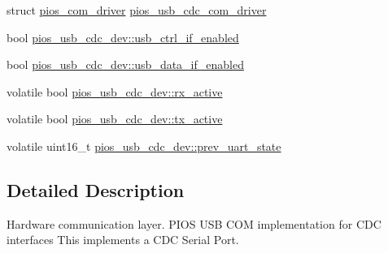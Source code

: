 \begin{DoxyCompactItemize}
\item 
struct \hyperlink{structpios__com__driver}{pios\-\_\-com\-\_\-driver} \hyperlink{group___p_i_o_s___u_s_b___c_o_m_gad661bf144c28ea36f290b0092e6957e2}{pios\-\_\-usb\-\_\-cdc\-\_\-com\-\_\-driver}
\item 
bool \hyperlink{group___p_i_o_s___u_s_b___c_o_m_ga27ad044c09bb6b13874d1d1281aa397f}{pios\-\_\-usb\-\_\-cdc\-\_\-dev\-::usb\-\_\-ctrl\-\_\-if\-\_\-enabled}
\item 
bool \hyperlink{group___p_i_o_s___u_s_b___c_o_m_gaa0a4b4afa2a6f6c20709f878b026ecc5}{pios\-\_\-usb\-\_\-cdc\-\_\-dev\-::usb\-\_\-data\-\_\-if\-\_\-enabled}
\item 
volatile bool \hyperlink{group___p_i_o_s___u_s_b___c_o_m_gad41e79606da14368c2716f4bc3c84618}{pios\-\_\-usb\-\_\-cdc\-\_\-dev\-::rx\-\_\-active}
\item 
volatile bool \hyperlink{group___p_i_o_s___u_s_b___c_o_m_ga5ebf71c716fc76c564cf8217adeb956c}{pios\-\_\-usb\-\_\-cdc\-\_\-dev\-::tx\-\_\-active}
\item 
volatile uint16\-\_\-t \hyperlink{group___p_i_o_s___u_s_b___c_o_m_ga945dfed2223e17061cb6e4257c2b2624}{pios\-\_\-usb\-\_\-cdc\-\_\-dev\-::prev\-\_\-uart\-\_\-state}
\end{DoxyCompactItemize}


\subsection{\-Detailed \-Description}
\-Hardware communication layer. \-P\-I\-O\-S \-U\-S\-B \-C\-O\-M implementation for \-C\-D\-C interfaces  \-This implements a \-C\-D\-C \-Serial \-Port. 

